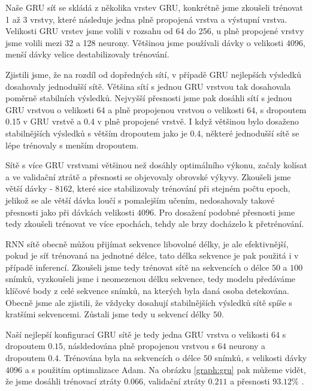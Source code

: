 Naše GRU síť se skládá z několika vrstev GRU, konkrétně jsme zkoušeli trénovat
1 až 3 vrstvy, které následuje jedna plně propojená vrstva a výstupní vrstva.
Velikosti GRU vrstev jsme volili v rozsahu od 64 do 256, u plně propojené
vrstvy jsme volili mezi 32 a 128 neurony. Většinou jsme používali dávky o
velikosti $4096$, menší dávky velice destabilizovaly trénování.

Zjistili jsme, že na rozdíl od dopředných sítí, v případě GRU nejlepších
výsledků dosahovaly jednodušší sítě. Většina sítí s jednou GRU vrstvou tak
dosahovala poměrně stabilních výsledků. Nejvyšší přesnosti jsme pak dosáhli
sítí s jednou GRU vrstvou o velikosti $64$ a plně propojenou vrstvou o
velikosti $64$, s dropoutem 0.15 v GRU vrstvě a 0.4 v plně propojené vrstvě. I
když většinou bylo dosaženo stabilnějších výsledků s větším dropoutem jako je
0.4, některé jednodušší sítě se lépe trénovaly s menším dropoutem.

Sítě s více GRU vrstvami většinou než dosáhly optimálního výkonu, začaly
kolísat a ve validační ztrátě a přesnosti se objevovaly obrovské výkyvy.
Zkoušeli jsme větší dávky - $8162$, které sice stabilizovaly trénování při
stejném počtu epoch, jelikož se ale větší dávka loučí s pomalejším učením,
nedosahovaly takové přesnosti jako při dávkách velikosti $4096$. Pro dosažení
podobné přesnosti jsme tedy zkoušeli trénovat ve více epochách, tehdy ale brzy
docházelo k přetrénování.

RNN sítě obecně můžou přijímat sekvence libovolné délky, je ale efektivnější,
pokud je síť trénovaná na jednotné délce, tato délka sekvence je pak použitá i
v případě inferencí. Zkoušeli jsme tedy trénovat sítě na sekvencích o délce
$50$ a $100$ snímků, vyzkoušeli jsme i neomezenou délku sekvence, tedy modelu
předáváme klíčové body z celé sekvence snímků, na kterých byla daná osoba
detekována. Obecně jsme ale zjistili, že vždycky dosahují stabilnějších
výsledků sítě spíše s kratšími sekvencemi. Zůstali jsme tedy u sekvencí délky
$50$.

Naší nejlepší konfigurací GRU sítě je tedy jedna GRU vrstva o velikosti $64$ s
dropoutem $0.15$, násldedována plně propojenou vrstvou s $64$ neurony a
dropoutem 0.4. Trénována byla na sekvencích o délce $50$ snímků, s velikosti
dávky $4096$ a s použitím optimalizace Adam. Na obrázku \ref{graph:gru} pak
můžeme vidět, že jsme dosáhli trénovací ztráty $0.066$, validační ztráty
$0.211$ a přesnosti $93.12\%$ .

